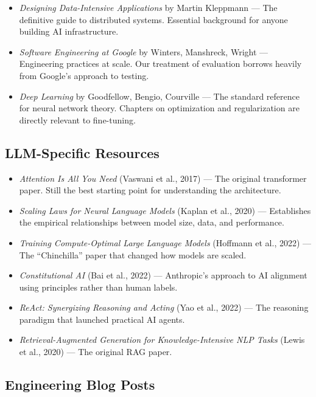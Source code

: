 \begin{itemize}[leftmargin=*]
    \item \textit{Designing Data-Intensive Applications} by Martin Kleppmann --- The definitive guide to distributed systems. Essential background for anyone building AI infrastructure.
    \item \textit{Software Engineering at Google} by Winters, Manshreck, Wright --- Engineering practices at scale. Our treatment of evaluation borrows heavily from Google's approach to testing.
    \item \textit{Deep Learning} by Goodfellow, Bengio, Courville --- The standard reference for neural network theory. Chapters on optimization and regularization are directly relevant to fine-tuning.
\end{itemize}

\subsection{LLM-Specific Resources}

\begin{itemize}[leftmargin=*]
    \item \textit{Attention Is All You Need} (Vaswani et al., 2017) --- The original transformer paper. Still the best starting point for understanding the architecture.
    \item \textit{Scaling Laws for Neural Language Models} (Kaplan et al., 2020) --- Establishes the empirical relationships between model size, data, and performance.
    \item \textit{Training Compute-Optimal Large Language Models} (Hoffmann et al., 2022) --- The ``Chinchilla'' paper that changed how models are scaled.
    \item \textit{Constitutional AI} (Bai et al., 2022) --- Anthropic's approach to AI alignment using principles rather than human labels.
    \item \textit{ReAct: Synergizing Reasoning and Acting} (Yao et al., 2022) --- The reasoning paradigm that launched practical AI agents.
    \item \textit{Retrieval-Augmented Generation for Knowledge-Intensive NLP Tasks} (Lewis et al., 2020) --- The original RAG paper.
\end{itemize}

\subsection{Engineering Blog Posts}

